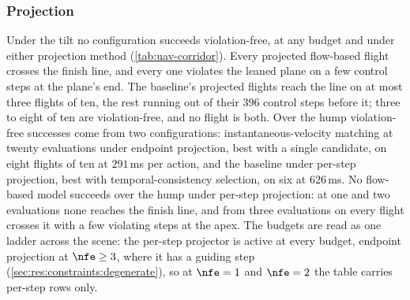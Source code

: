 \FloatBarrier
\subsubsection{Projection}\label{sec:res:uav:projected}
Under the tilt no configuration succeeds violation-free, at any budget and under either projection method
(\autoref{tab:uav-corridor}). Every projected flow-based flight crosses the finish line, and every one
violates the leaned plane on a few control steps at the plane's end. The baseline's projected flights
reach the line on at most three flights of ten, the rest running out of their $396$ control steps before
it; three to eight of ten are violation-free, and no flight is both. Over the hump violation-free
successes come from two configurations: instantaneous-velocity matching at twenty evaluations under
endpoint projection, best with a single candidate, on eight flights of ten at $291$\,ms per action, and
the baseline under per-step projection, best with temporal-consistency selection, on six at $626$\,ms. No
flow-based model succeeds over the hump under per-step projection: at one and two evaluations none reaches the finish line, and from
three evaluations on every flight crosses it with a few violating steps at the apex. The budgets are read
as one ladder across the scene: the per-step projector is active at every budget, endpoint projection at
$\nfe\ge 3$, where it has a guiding step (\autoref{sec:res:constraints:degenerate}), so at $\nfe=1$ and
$\nfe=2$ the table carries per-step rows only.

